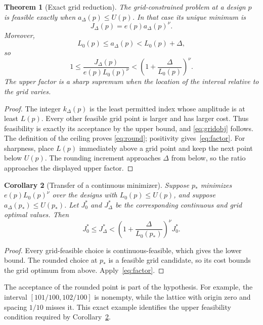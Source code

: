 \documentclass[11pt,a4paper]{article}
\newtheorem{theorem}{Theorem}\newtheorem{proposition}[theorem]{Proposition}\newtheorem{lemma}[theorem]{Lemma}\newtheorem{corollary}[theorem]{Corollary}\theoremstyle{definition}\newtheorem{definition}[theorem]{Definition}\newtheorem{example}[theorem]{Example}
\begin{document}
\begin{theorem}[Exact grid reduction]\label{thm:grid}
The grid-constrained problem at a design $p$ is feasible exactly when
$a_\Delta(p)\le U(p)$. In that case its unique minimum is
\begin{equation}\label{eq:gridobj}
 \boxed{J_\Delta(p)=e(p)a_\Delta(p)^\nu.}
\end{equation}
Moreover,
\begin{equation}\label{eq:round}
 L_0(p)\le a_\Delta(p)<L_0(p)+\Delta,
\end{equation}
so
\begin{equation}\label{eq:factor}
 1\le\frac{J_\Delta(p)}{e(p)L_0(p)^\nu}
 <\left(1+\frac{\Delta}{L_0(p)}\right)^\nu.
\end{equation}
The upper factor is a sharp supremum when the location of the interval
relative to the grid varies.
\end{theorem}
\begin{proof}
The integer $k_\Delta(p)$ is the least permitted index whose amplitude is
at least $L(p)$. Every other feasible grid point is larger and has larger
cost. Thus feasibility is exactly its acceptance by the upper bound, and
\eqref{eq:gridobj} follows. The definition of the ceiling proves
\eqref{eq:round}; positivity gives~\eqref{eq:factor}.
For sharpness, place $L(p)$ immediately above a grid point and keep the next
point below $U(p)$. The rounding increment approaches $\Delta$ from below,
so the ratio approaches the displayed upper factor.
\end{proof}

\begin{corollary}[Transfer of a continuous minimizer]\label{cor:transfer}
Suppose $p_*$ minimizes $e(p)L_0(p)^\nu$ over the designs with
$L_0(p)\le U(p)$, and suppose $a_\Delta(p_*)\le U(p_*)$.
Let $J^*_0$ and $J^*_\Delta$ be the corresponding continuous and grid
optimal values. Then
\[
 J^*_0\le J^*_\Delta
 <\left(1+\frac{\Delta}{L_0(p_*)}\right)^\nu J^*_0.
\]
\end{corollary}
\begin{proof}
Every grid-feasible choice is continuous-feasible, which gives the lower
bound. The rounded choice at $p_*$ is a feasible grid candidate, so its cost
bounds the grid optimum from above. Apply~\eqref{eq:factor}.
\end{proof}

The acceptance of the rounded point is part of the hypothesis. For example,
the interval $[101/100,102/100]$ is nonempty, while the lattice with origin
zero and spacing $1/10$ misses it. This exact example identifies the upper
feasibility condition required by Corollary~\ref{cor:transfer}.
\end{document}
